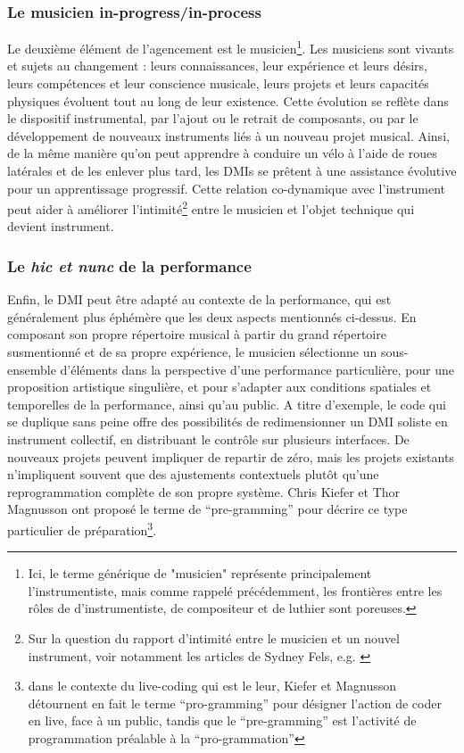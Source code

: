 \subsubsection{Le musicien in-progress/in-process}

\noindent Le deuxième élément de l'agencement est le musicien\footnote{Ici, le terme générique de "musicien" représente principalement l'instrumentiste, mais comme rappelé précédemment, les frontières entre les rôles de d'instrumentiste, de compositeur et de luthier sont poreuses.}. Les musiciens sont vivants et sujets au changement : leurs connaissances, leur expérience et leurs désirs, leurs compétences et leur conscience musicale, leurs projets et leurs capacités physiques évoluent tout au long de leur existence. Cette évolution se reflète dans le dispositif instrumental, par l'ajout ou le retrait de composants, ou par le développement de nouveaux instruments liés à un nouveau projet musical. Ainsi, de la même manière qu'on peut apprendre à conduire un vélo à l'aide de roues latérales et de les enlever plus tard, les \glspl{DMI} se prêtent à une assistance évolutive pour un apprentissage progressif. Cette relation co-dynamique avec l'instrument peut aider à améliorer l'intimité\footnote{Sur la question du rapport d'intimité entre le musicien et un nouvel instrument, voir notamment les articles de Sydney Fels, e.g. \cite{fels_designing_2004}} entre le musicien et l'objet technique qui devient instrument.\\

\subsubsection{Le \textit{hic et nunc} de la performance}

\noindent Enfin, le \gls{DMI} peut être adapté au contexte de la performance, qui est généralement plus éphémère que les deux aspects mentionnés ci-dessus.
En composant son propre répertoire musical à partir du grand répertoire susmentionné et de sa propre expérience, le musicien sélectionne un sous-ensemble d'éléments dans la perspective d'une performance particulière, pour une proposition artistique singulière, et pour s'adapter aux conditions spatiales et temporelles de la performance, ainsi qu'au public. A titre d'exemple, le code qui se duplique sans peine offre des possibilités de redimensionner un \gls{DMI} soliste en instrument collectif, en distribuant le contrôle sur plusieurs interfaces. De nouveaux projets peuvent impliquer de repartir de zéro, mais les projets existants n'impliquent souvent que des ajustements contextuels plutôt qu'une reprogrammation complète de son propre système. Chris Kiefer et Thor Magnusson ont proposé le terme de ``pre-gramming'' \cite{kiefer_live_2019} pour décrire ce type particulier de préparation\footnote{dans le contexte du live-coding qui est le leur, Kiefer et Magnusson détournent en fait le terme ``pro-gramming'' pour désigner l'action de coder en live, face à un public, tandis que le ``pre-gramming'' est l'activité de programmation préalable à la ``pro-grammation''}.
	


